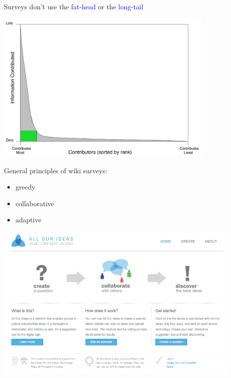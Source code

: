 \documentclass[aspectratio=169]{beamer}
\begin{document}
\begin{frame}

\hspace{0.7in}Surveys don't use the \textcolor{blue}{fat-head} or the \textcolor{blue}{long-tail}

\begin{center}
\includegraphics[width=0.8\textwidth]{figures/zipf_plot_withoverlay}
\end{center}

\end{frame}
\begin{frame}

General principles of wiki surveys:
\begin{itemize}
\item greedy
\pause
\item collaborative
\pause
\item adaptive
\end{itemize}

\end{frame}
\begin{frame}

\begin{center}
\includegraphics[width=0.9\textwidth]{figures/aoi_splash}
\end{center}

\end{frame}
\end{document}
